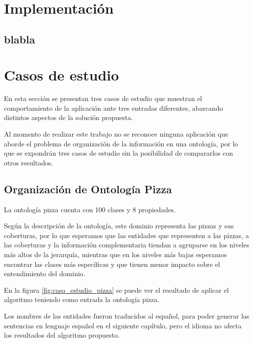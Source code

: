\section{Implementación}
\subsection{blabla}

\section{Casos de estudio}
En esta sección se presentan tres casos de estudio que muestran el comportamiento de la aplicación ante tres entradas diferentes, abarcando distintos aspectos de la solución propuesta.

Al momento de realizar este trabajo no se reconoce ninguna aplicación que aborde el problema de organización de la información en una ontología, por lo que se expondrán tres casos de estudio sin la posibilidad de compararlos con otros resultados.

\subsection{Organización de Ontología Pizza}
La ontología pizza cuenta con 100 clases y 8 propiedades.

Según la descripción de la ontología, este dominio representa las pizzas y sus coberturas, por lo que esperamos que las entidades que representen a las pizzas, a las coberturas y la información complementaria tiendan a agruparse en los niveles más altos de la jerarquía, mientras que en los niveles más bajas esperamos encontrar las clases más específicas y que tienen menor impacto sobre el entendimiento del dominio.

En la figura \ref{fig:caso_estudio_pizza} se puede ver el resultado de aplicar el algoritmo teniendo como entrada la ontología pizza. 

Los nombres de las entidades fueron traducidos al español, para poder generar las sentencias en lenguaje español en el siguiente capítulo, pero el idioma no afecta los resultados del algoritmo propuesto.

